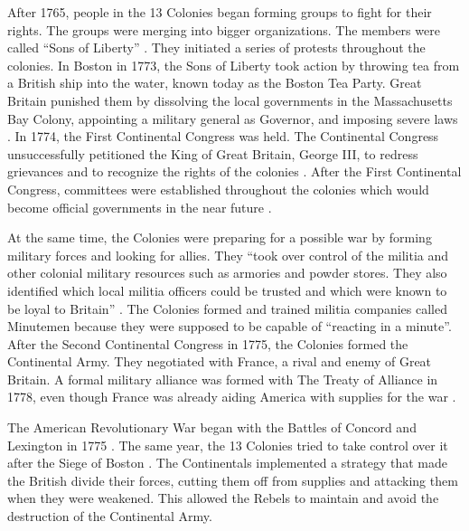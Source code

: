 After 1765, people in the 13 Colonies began forming groups to fight for their
rights.  The groups were merging into bigger organizations.  The members were
called “Sons of Liberty” \cite[p.227,234]{knollenberg_growth_2003}.  They initiated a series of
protests throughout the colonies.  In Boston in 1773, the Sons of Liberty took
action by throwing tea from a British ship into the water, known today as the
Boston Tea Party.  Great Britain punished them by dissolving the local
governments in the Massachusetts Bay Colony, appointing a military general as
Governor, and imposing severe laws \cite[p.108-109]{ladenburg_causes_1989}.  In 1774, the First
Continental Congress was held. The Continental Congress unsuccessfully
petitioned the King of Great Britain, George III, to redress grievances and to
recognize the rights of the colonies \cite[p.9]{knollenberg_growth_2003}.  After the First
Continental Congress, committees were established throughout the colonies which
would become official governments in the near future \cite[p.46]{stewart_2005}.

At the same time, the Colonies were preparing for a possible war by forming
military forces and looking for allies.  They “took over control of the militia
and other colonial military resources such as armories and powder stores.  They
also identified which local militia officers could be trusted and which were
known to be loyal to Britain” \cite[p.46]{stewart_2005}.   The Colonies formed and trained
militia companies called Minutemen because they were supposed to be capable of
“reacting in a minute”.  After the Second Continental Congress in 1775, the
Colonies formed the Continental Army.  They negotiated with France, a rival and
enemy of Great Britain.  A formal military alliance was formed with The Treaty
of Alliance in 1778, even though France was already aiding America with supplies
for the war \cite[p.46,51,76,85]{stewart_2005}.

The American Revolutionary War began with the Battles of Concord and Lexington
in 1775 \cite[p.111-113]{ladenburg_causes_1989}.  The same year, the 13 Colonies tried to take
control over it after the Siege of Boston \cite[p.55]{stewart_2005}.  The Continentals
implemented a strategy that made the British divide their forces, cutting them
off from supplies and attacking them when they were weakened.  This allowed the
Rebels to maintain and avoid the destruction of the Continental Army. 

